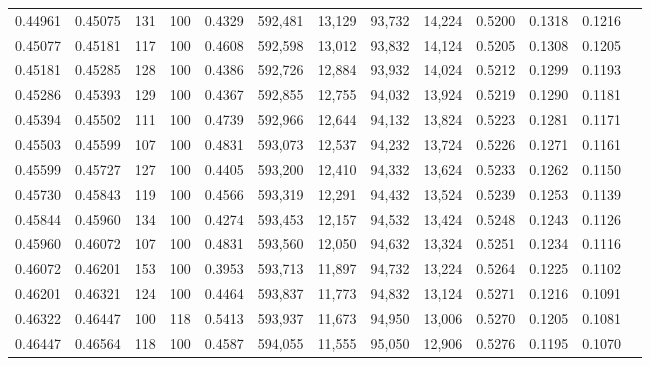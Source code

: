 \begin{tabular}{rrrrrrrrrrrrr}
0.44961 & 0.45075 &   131 & 100 &                                     0.4329 & 592,481 &  13,129 &  93,732 &  14,224 & 0.5200 & 0.1318 & 0.1216 \\
0.45077 & 0.45181 &   117 & 100 &                                     0.4608 & 592,598 &  13,012 &  93,832 &  14,124 & 0.5205 & 0.1308 & 0.1205 \\
0.45181 & 0.45285 &   128 & 100 &                                     0.4386 & 592,726 &  12,884 &  93,932 &  14,024 & 0.5212 & 0.1299 & 0.1193 \\
0.45286 & 0.45393 &   129 & 100 &                                     0.4367 & 592,855 &  12,755 &  94,032 &  13,924 & 0.5219 & 0.1290 & 0.1181 \\
0.45394 & 0.45502 &   111 & 100 &                                     0.4739 & 592,966 &  12,644 &  94,132 &  13,824 & 0.5223 & 0.1281 & 0.1171 \\
0.45503 & 0.45599 &   107 & 100 &                                     0.4831 & 593,073 &  12,537 &  94,232 &  13,724 & 0.5226 & 0.1271 & 0.1161 \\
0.45599 & 0.45727 &   127 & 100 &                                     0.4405 & 593,200 &  12,410 &  94,332 &  13,624 & 0.5233 & 0.1262 & 0.1150 \\
0.45730 & 0.45843 &   119 & 100 &                                     0.4566 & 593,319 &  12,291 &  94,432 &  13,524 & 0.5239 & 0.1253 & 0.1139 \\
0.45844 & 0.45960 &   134 & 100 &                                     0.4274 & 593,453 &  12,157 &  94,532 &  13,424 & 0.5248 & 0.1243 & 0.1126 \\
0.45960 & 0.46072 &   107 & 100 &                                     0.4831 & 593,560 &  12,050 &  94,632 &  13,324 & 0.5251 & 0.1234 & 0.1116 \\
0.46072 & 0.46201 &   153 & 100 &                                     0.3953 & 593,713 &  11,897 &  94,732 &  13,224 & 0.5264 & 0.1225 & 0.1102 \\
0.46201 & 0.46321 &   124 & 100 &                                     0.4464 & 593,837 &  11,773 &  94,832 &  13,124 & 0.5271 & 0.1216 & 0.1091 \\
0.46322 & 0.46447 &   100 & 118 &                                     0.5413 & 593,937 &  11,673 &  94,950 &  13,006 & 0.5270 & 0.1205 & 0.1081 \\
0.46447 & 0.46564 &   118 & 100 &                                     0.4587 & 594,055 &  11,555 &  95,050 &  12,906 & 0.5276 & 0.1195 & 0.1070 \\

\end{tabular}
